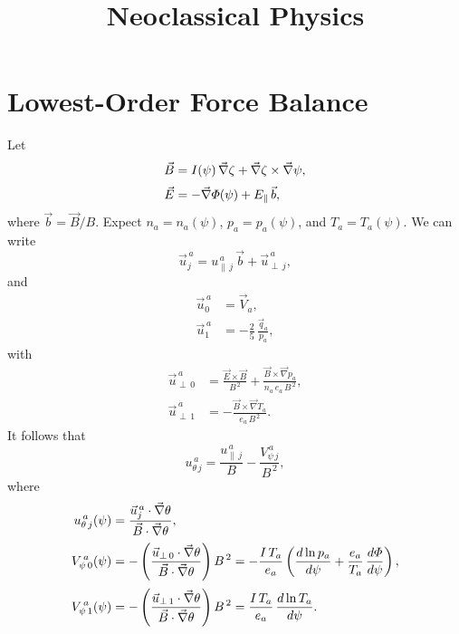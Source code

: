 \documentclass[12pt]{article}
\title{\bf Neoclassical Physics}
\date{}
\author{}
\begin{document}
\maketitle

\section{Lowest-Order Force Balance}
Let
\begin{align}
\vec{B} &= I(\psi)\,\vec{\nabla} \zeta + \vec{\nabla}\zeta\times \vec{\nabla}\psi,\\[0.5ex]
\vec{E} &= -\vec{\nabla}{\mit\Phi}(\psi) + E_\parallel\,\vec{b}, 
\end{align}
where $\vec{b}=\vec{B}/B$.
Expect $n_a=n_a(\psi)$, $p_a=p_a(\psi)$, and $T_a= T_a(\psi)$.
We can write
\begin{equation}
\vec{u}_j^{\,a} = u_{\parallel\,j}^{\,a}\,\vec{b} + \vec{u}_{\perp\,j}^{\,a},
\end{equation}
and 
\begin{align}
\vec{u}_0^{\,a} &= \vec{V}_a,\\[0.5ex]
\vec{u}_1^{\,a} &= - \frac{2}{5}\,\frac{\vec{q}_a}{p_a},
\end{align}
with 
\begin{align}
\vec{u}_{\perp\,0}^{\,a} &= \frac{\vec{E}\times \vec{B}}{B^{\,2}} + \frac{\vec{B}\times \vec{\nabla} p_a}{n_a\,e_a\,B^{\,2}},\\[0.5ex]
\vec{u}_{\perp\,1}^{\,a}&= - \frac{\vec{B}\times \vec{\nabla} T_a}{e_a\,B^{\,2}}.
\end{align}
It follows that
\begin{equation}\label{e24x}
u_{\theta\,j}^{\,a} = \frac{u_{\parallel\,j}^{\,a}}{B} - \frac{V_{\psi\,j}^{\,a}}{B^{\,2}},
\end{equation}
where
\begin{align}
u_{\theta\,j}^{\,a}(\psi) &= \frac{\vec{u}_j^{\,a}\cdot\vec{\nabla}\theta}{\vec{B}\cdot\vec{\nabla}\theta},\\[0.5ex]
V_{\psi\,0}^{\,a}(\psi) &=-\left( \frac{\vec{u}_{\perp\,0}\cdot\vec{\nabla}\theta}{\vec{B}\cdot\vec{\nabla}\theta}\right)B^{\,2}=
- \frac{I\,T_a}{e_a}\left(\frac{d \ln p_a}{d\psi}+\frac{e_a}{T_a}\,\frac{d{\mit\Phi}}{d\psi}\right),\\[0.5ex]
V_{\psi\,1}^{\,a}(\psi) &= -\left(\frac{\vec{u}_{\perp\,1}\cdot\vec{\nabla}\theta}{\vec{B}\cdot\vec{\nabla}\theta}\right)B^{\,2}=
\frac{I\,T_a}{e_a}\,\frac{d\ln T_a}{d\psi}.
\end{align}
\end{document}
